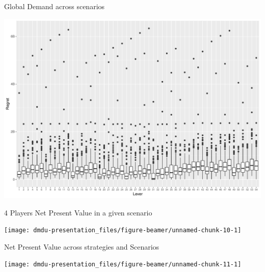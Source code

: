 \documentclass[ignorenonframetext,]{beamer}
\begin{document}
\begin{frame}{Global Demand across scenarios}

\begin{center}\includegraphics{dmdu-presentation_files/figure-beamer/unnamed-chunk-9-1} \end{center}

\end{frame}

\begin{frame}{4 Players Net Present Value in a given scenario}

\begin{center}\texttt{[image: dmdu-presentation\_files/figure-beamer/unnamed-chunk-10-1]} \end{center}

\end{frame}

\begin{frame}{Net Present Value across strategies and Scenarios}

\begin{center}\texttt{[image: dmdu-presentation\_files/figure-beamer/unnamed-chunk-11-1]} \end{center}

\end{frame}
\end{document}
